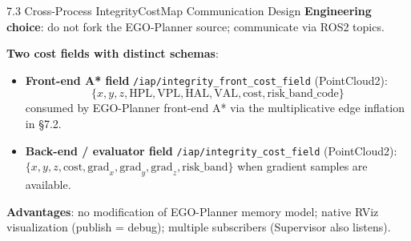 \documentclass[10pt,aspectratio=169,xcolor=dvipsnames]{beamer}
\newcommand{\HPL}{\mathrm{HPL}}
\newcommand{\VPL}{\mathrm{VPL}}
\newcommand{\HAL}{\mathrm{HAL}}
\newcommand{\VAL}{\mathrm{VAL}}
\newcommand{\1}{\mathbb{1}}
\begin{document}
\begin{frame}{7.3 Cross-Process IntegrityCostMap Communication Design}
  \small
  \textbf{Engineering choice}: do not fork the EGO-Planner source; communicate via ROS2 topics.

  \medskip
  \begin{center}
  \end{center}

  \medskip
  \textbf{Two cost fields with distinct schemas}:
  \begin{itemize}\scriptsize
    \item \textbf{Front-end A* field} \texttt{/iap/integrity\_front\_cost\_field} (PointCloud2):
      \[
        \{x,y,z,\HPL,\VPL,\HAL,\VAL,\text{cost},\text{risk\_band\_code}\}
      \]
      consumed by EGO-Planner front-end A* via the multiplicative edge inflation in \S 7.2.
    \item \textbf{Back-end / evaluator field} \texttt{/iap/integrity\_cost\_field} (PointCloud2):
      $\{x,y,z,\text{cost},\text{grad}_x,\text{grad}_y,\text{grad}_z,\text{risk\_band}\}$ when gradient samples are available.
  \end{itemize}

  \textbf{Advantages}: no modification of EGO-Planner memory model; native RViz visualization (publish = debug); multiple subscribers (Supervisor also listens).
\end{frame}
\end{document}
